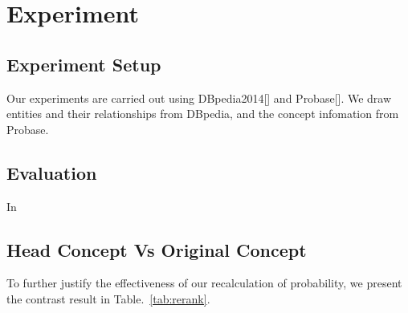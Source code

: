 \section{Experiment}
\label{sec:exp}

\subsection{Experiment Setup}

Our experiments are carried out using DBpedia2014[] and Probase[]. We draw entities and their relationships from DBpedia, and the concept infomation from Probase.

\subsection{Evaluation}
In


\subsection{Head Concept Vs Original Concept}

To further justify the effectiveness of our recalculation of probability, we present the contrast result in Table.~\ref{tab:rerank}.



